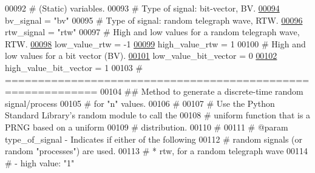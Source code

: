 \begin{DoxyCode}
00092     \textcolor{comment}{# (Static) variables.}
00093     \textcolor{comment}{# Type of signal: bit-vector, BV.}
\hypertarget{random__process__generator_8py_source_l00094}{}\hyperlink{classrandom__process__models_1_1random__process__generator_1_1rand__signal__generator_ab5e9d283e3d5d2a2c6ba58897d208547}{00094}     bv\_signal = \textcolor{stringliteral}{"bv"}
00095     \textcolor{comment}{# Type of signal: random telegraph wave, RTW.}
\hypertarget{random__process__generator_8py_source_l00096}{}\hyperlink{classrandom__process__models_1_1random__process__generator_1_1rand__signal__generator_a6628ea9c95a141778e1bb0e8ba8d0845}{00096}     rtw\_signal = \textcolor{stringliteral}{"rtw"}
00097     \textcolor{comment}{# High and low values for a random telegraph wave, RTW.}
\hypertarget{random__process__generator_8py_source_l00098}{}\hyperlink{classrandom__process__models_1_1random__process__generator_1_1rand__signal__generator_a5c3b5601f4bbf03559fb7607929f7f7f}{00098}     low\_value\_rtw = -1
\hypertarget{random__process__generator_8py_source_l00099}{}\hyperlink{classrandom__process__models_1_1random__process__generator_1_1rand__signal__generator_a71277d93f7a9f93faa86fb40e04e1f19}{00099}     high\_value\_rtw = 1
00100     \textcolor{comment}{# High and low values for a bit vector (BV).}
\hypertarget{random__process__generator_8py_source_l00101}{}\hyperlink{classrandom__process__models_1_1random__process__generator_1_1rand__signal__generator_a68859568af63a4990b97fcfc4a604884}{00101}     low\_value\_bit\_vector = 0
\hypertarget{random__process__generator_8py_source_l00102}{}\hyperlink{classrandom__process__models_1_1random__process__generator_1_1rand__signal__generator_ada393b856bd4abbd328d3c87fb13e120}{00102}     high\_value\_bit\_vector = 1
00103     \textcolor{comment}{# ============================================================}
00104     \textcolor{comment}{##  Method to generate a discrete-time random signal/process}
00105     \textcolor{comment}{#       for "n" values.}
00106     \textcolor{comment}{#}
00107     \textcolor{comment}{#   Use the Python Standard Library's random module to call the}
00108     \textcolor{comment}{#       uniform function that is a PRNG based on a uniform}
00109     \textcolor{comment}{#       distribution.}
00110     \textcolor{comment}{#}
00111     \textcolor{comment}{#   @param type\_of\_signal - Indicates if either of the following}
00112     \textcolor{comment}{#               random signals (or random "processes") are used.}
00113     \textcolor{comment}{#               * rtw, for a random telegraph wave}
00114     \textcolor{comment}{#                   - high value: "1"}

\end{DoxyCode}
